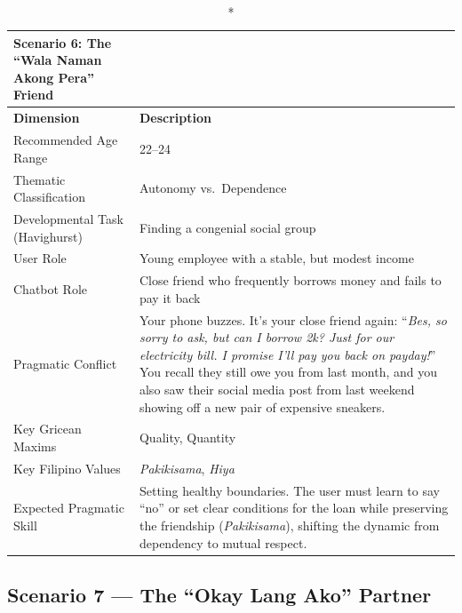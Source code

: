 \begin{longtable}{p{4.5cm} p{11cm}}
\caption*{Scenario 6: The ``Wala Naman Akong Pera'' Friend} \\
\toprule
\textbf{Dimension} & \textbf{Description} \\
\midrule
\endhead
Recommended Age Range          & 22--24 \\
\midrule
Thematic Classification        & Autonomy vs.\ Dependence \\
\midrule
Developmental Task (Havighurst)& Finding a congenial social group \\
\midrule
User Role                      & Young employee with a stable, but modest income \\
\midrule
Chatbot Role                   & Close friend who frequently borrows money and fails to pay it back \\
\midrule
Pragmatic Conflict             & Your phone buzzes. It's your close friend again:
                                 ``\textit{Bes, so sorry to ask, but can I borrow 2k? Just for our
                                 electricity bill. I promise I'll pay you back on payday!}'' You recall
                                 they still owe you from last month, and you also saw their social media
                                 post from last weekend showing off a new pair of expensive sneakers. \\
\midrule
Key Gricean Maxims             & Quality, Quantity \\
\midrule
Key Filipino Values            & \textit{Pakikisama}, \textit{Hiya} \\
\midrule
Expected Pragmatic Skill       & Setting healthy boundaries. The user must learn to say ``no'' or set
                                 clear conditions for the loan while preserving the friendship
                                 (\textit{Pakikisama}), shifting the dynamic from dependency to mutual
                                 respect. \\
\bottomrule
\end{longtable}
 
\subsection*{Scenario 7 --- The ``Okay Lang Ako'' Partner}
 

